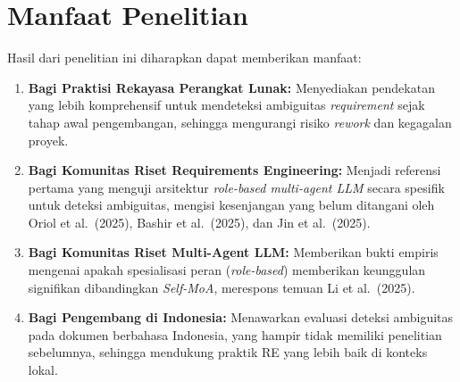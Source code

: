 \section{Manfaat Penelitian}
Hasil dari penelitian ini diharapkan dapat memberikan manfaat:
\begin{enumerate}
	\item \textbf{Bagi Praktisi Rekayasa Perangkat Lunak:} Menyediakan pendekatan yang lebih komprehensif untuk mendeteksi ambiguitas \textit{requirement} sejak tahap awal pengembangan, sehingga mengurangi risiko \textit{rework} dan kegagalan proyek.
	\item \textbf{Bagi Komunitas Riset Requirements Engineering:} Menjadi referensi pertama yang menguji arsitektur \textit{role-based multi-agent LLM} secara spesifik untuk deteksi ambiguitas, mengisi kesenjangan yang belum ditangani oleh Oriol et al.\ (2025), Bashir et al.\ (2025), dan Jin et al.\ (2025).
	\item \textbf{Bagi Komunitas Riset Multi-Agent LLM:} Memberikan bukti empiris mengenai apakah spesialisasi peran (\textit{role-based}) memberikan keunggulan signifikan dibandingkan \textit{Self-MoA}, merespons temuan Li et al.\ (2025).
	\item \textbf{Bagi Pengembang di Indonesia:} Menawarkan evaluasi deteksi ambiguitas pada dokumen berbahasa Indonesia, yang hampir tidak memiliki penelitian sebelumnya, sehingga mendukung praktik RE yang lebih baik di konteks lokal.
\end{enumerate}
